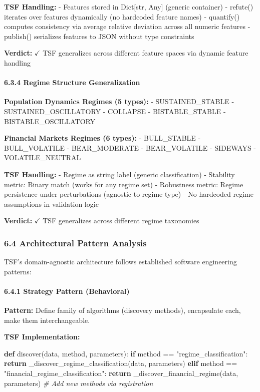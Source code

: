 \documentclass[
]{article}
\newenvironment{Shaded}{}{}
\newcommand{\CommentTok}[1]{\textcolor[rgb]{0.38,0.63,0.69}{\textit{#1}}}
\newcommand{\ControlFlowTok}[1]{\textcolor[rgb]{0.00,0.44,0.13}{\textbf{#1}}}
\newcommand{\KeywordTok}[1]{\textcolor[rgb]{0.00,0.44,0.13}{\textbf{#1}}}
\newcommand{\NormalTok}[1]{#1}
\newcommand{\OperatorTok}[1]{\textcolor[rgb]{0.40,0.40,0.40}{#1}}
\newcommand{\StringTok}[1]{\textcolor[rgb]{0.25,0.44,0.63}{#1}}
\begin{document}
\textbf{TSF Handling:} - Features stored in Dict{[}str, Any{]} (generic
container) - refute() iterates over features dynamically (no hardcoded
feature names) - quantify() computes consistency via average relative
deviation across all numeric features - publish() serializes features to
JSON without type constraints

\textbf{Verdict:} $\checkmark$ TSF generalizes across different feature spaces via
dynamic feature handling

\paragraph{6.3.4 Regime Structure
Generalization}\label{regime-structure-generalization}

\textbf{Population Dynamics Regimes (5 types):} - SUSTAINED\_STABLE -
SUSTAINED\_OSCILLATORY - COLLAPSE - BISTABLE\_STABLE -
BISTABLE\_OSCILLATORY

\textbf{Financial Markets Regimes (6 types):} - BULL\_STABLE -
BULL\_VOLATILE - BEAR\_MODERATE - BEAR\_VOLATILE - SIDEWAYS -
VOLATILE\_NEUTRAL

\textbf{TSF Handling:} - Regime as string label (generic classification)
- Stability metric: Binary match (works for any regime set) - Robustness
metric: Regime persistence under perturbations (agnostic to regime type)
- No hardcoded regime assumptions in validation logic

\textbf{Verdict:} $\checkmark$ TSF generalizes across different regime taxonomies

\subsubsection{6.4 Architectural Pattern
Analysis}\label{architectural-pattern-analysis}

TSF's domain-agnostic architecture follows established software
engineering patterns:

\paragraph{6.4.1 Strategy Pattern
(Behavioral)}\label{strategy-pattern-behavioral}

\textbf{Pattern:} Define family of algorithms (discovery methods),
encapsulate each, make them interchangeable.

\textbf{TSF Implementation:}

\begin{Shaded}
\begin{Highlighting}[]
\KeywordTok{def}\NormalTok{ discover(data, method, parameters):}
    \ControlFlowTok{if}\NormalTok{ method }\OperatorTok{==} \StringTok{"regime\_classification"}\NormalTok{:}
        \ControlFlowTok{return}\NormalTok{ \_discover\_regime\_classification(data, parameters)}
    \ControlFlowTok{elif}\NormalTok{ method }\OperatorTok{==} \StringTok{"financial\_regime\_classification"}\NormalTok{:}
        \ControlFlowTok{return}\NormalTok{ \_discover\_financial\_regime(data, parameters)}
    \CommentTok{\# Add new methods via registration}
\end{Highlighting}
\end{Shaded}
\end{document}
